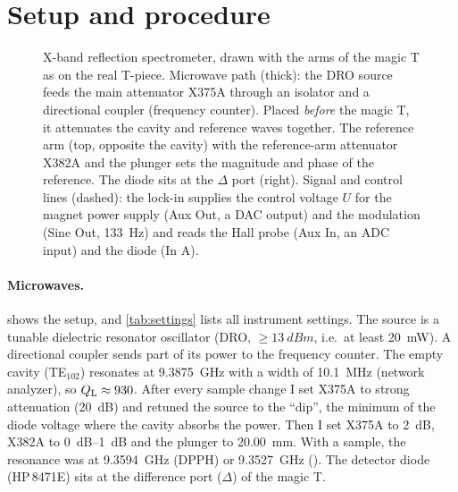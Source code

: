 \section{Setup and procedure}\label{sec:setup}

\begin{figure}[t]
  \centering
  \resizebox{\textwidth}{!}{}
  \caption{X-band reflection spectrometer, drawn with the arms of the magic T as on the real T-piece. Microwave path
  (thick): the DRO source feeds the main attenuator X375A through an isolator and a directional coupler (frequency
  counter). Placed \emph{before} the magic T, it attenuates the cavity and reference waves together. The reference arm
  (top, opposite the cavity) with the reference-arm attenuator X382A and the plunger sets the magnitude and phase of the
  reference. The diode sits at the $\Delta$ port (right). Signal and control lines (dashed): the lock-in supplies the
  control voltage $U$ for the magnet power supply (Aux Out, a DAC output) and the modulation (Sine Out, \qty{133}{Hz})
  and reads the Hall probe (Aux In, an ADC input) and the diode (In A).}
  \label{fig:setup}
\end{figure}

\paragraph{Microwaves.}
 shows the setup, and \cref{tab:settings} lists all instrument settings. The source is a tunable
dielectric resonator oscillator (DRO, $\geq\qty{13}{dBm}$, i.e.\ at least \qty{20}{mW}). A directional coupler sends
part of its power to the frequency counter. The empty cavity (TE$_{102}$) resonates at \qty{9.3875}{GHz} with a
width of \qty{10.1}{MHz} (network analyzer), so $Q_\mathrm{L}\approx930$. After every sample change I set X375A to strong
attenuation (\qty{20}{dB}) and retuned the source to the \enquote{dip}, the minimum of the diode voltage where the
cavity absorbs the power. Then I set X375A to \qty{2}{dB}, X382A to \qtyrange{0}{1}{dB} and the plunger to
\qty{20.00}{mm}. With a sample, the resonance was at \qty{9.3594}{GHz} (DPPH) or \qty{9.3527}{GHz} (). The
detector diode (HP\,8471E) sits at the difference port ($\Delta$) of the magic T.

